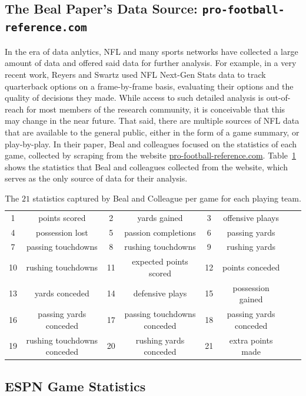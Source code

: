 \documentclass[10pt]{article}
\begin{document}
\subsection{The Beal Paper's Data Source: \texttt{pro-football-reference.com}}

In the era of data anlytics, NFL and many sports networks have collected a large amount of
data and offered said data for further analysis. For example, in a very recent work,
Reyers and Swartz \cite{reyers2023quarterback} used NFL Next-Gen Stats data to track
quarterback options on a frame-by-frame basis, evaluating their options and the quality of
decisions they made. While access to such detailed analysis is out-of-reach for most members
of the research community, it is conceivable that this may change in the near future. That
said, there are multiple sources of NFL data that are available to the general public, either
in the form of a game summary, or play-by-play. In their paper, Beal and colleagues focused on
the statistics of each game, collected by scraping from the website
\url{pro-football-reference.com}. Table~\ref{table:beal-features}
shows the statistics that Beal and colleagues collected from the website, which serves
as the only source of data for their analysis.

\begin{table}
\begin{tabular}{|cc|cc|cc|cc|}
\hline
1 & points scored &
2 & yards gained &
3 & offensive plaays \\
4 & possession lost &
5 & passion completions &
6 & passing yards \\
7 & passing touchdowns &
8 & rushing touchdowns &
9 & rushing yards \\
10 & rushing touchdowns &
11 & expected points scored &
12 & points conceded \\
13 & yards conceded &
14 & defensive plays &
15 & possession gained \\
16 & passing yards conceded &
17 & passing touchdowns conceded &
18 & passing yards conceded \\
19 & rushing touchdowns conceded &
20 & rushing yards conceded &
21 & extra points made \\
\hline
\end{tabular}
\caption{The $21$ statistics captured by Beal and Colleague per game for each playing team.}
\label{table:beal-features}
\end{table}

\subsection{ESPN Game Statistics}
\end{document}
